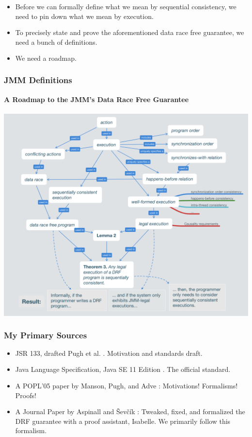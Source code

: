 \begin{frame}
    \begin{itemize}
        \item Before we can formally define what we mean by sequential
              consistency, we need to pin down what we mean by execution.

        \item To precisely state and prove the aforementioned data race free
              guarantee, we need a bunch of definitions.

        \item We need a roadmap.
    \end{itemize}
\end{frame}

\begin{frame}
    \frametitle{JMM Definitions}
    \framesubtitle{A Roadmap to the JMM's Data Race Free Guarantee}
    \centering
    \includegraphics[width=\textwidth,height=0.85\textheight,keepaspectratio]{jmm_definitions_overview.png}
\end{frame}

\begin{frame}
    \frametitle{My Primary Sources}
    \begin{itemize}
        \item JSR 133, drafted Pugh et al. \cite{pugh2004jsr133}. Motivation and
              standards draft.
        \item Java Language Specification, Java SE 11 Edition \cite{gosling2018jls11}.
              The official standard.
        \item A POPL'05 paper by Manson, Pugh, and Adve \cite{manson2005java}:
              Motivations! Formalisms! Proofs!
        \item A Journal Paper by Aspinall and {\v{S}}ev{\v{c}}{\'i}k \cite{aspinall2007formalising}:
              Tweaked, fixed, and formalized the DRF guarantee with a proof
              assistant, Isabelle. We primarily follow this formalism.
    \end{itemize}
\end{frame}

